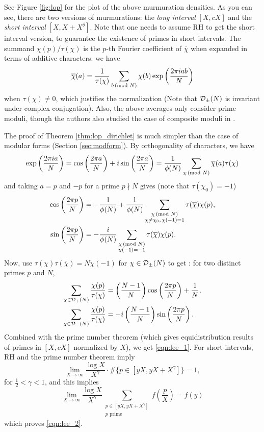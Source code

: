 See Figure \ref{fig:lop} for the plot of the above murmuration densities.
As you can see, there are two versions of murmurations: the \emph{long interval} $[X, cX]$ and the \emph{short interval} $[X, X + X^\delta]$.
Note that one needs to assume RH to get the short interval version, to guarantee the existence of primes in short intervals.
The summand $\chi(p) / \tau(\chi)$ is the $p$-th Fourier coefficient of $\overline{\chi}$ when expanded in terms of additive characters: we have \cite[eq. (3.12)]{iwaniec2021analytic}
\[
\overline{\chi}(a) = \frac{1}{\tau(\chi)} \sum_{b \,(\text{mod }N)} \chi(b) \exp\left(\frac{2 \pi i ab}{N}\right)
\]
when $\tau(\chi) \ne 0$, which justifies the normalization (Note that $\mathcal{D}_\pm(N)$ is invariant under complex conjugation).
Also, the above averages only consider prime moduli, though the authors also studied the case of composite moduli in \cite[Section 6.1]{lee2025murmurations}.

The proof of Theorem \ref{thm:lop_dirichlet} is much simpler than the case of modular forms (Section \ref{sec:modform}).
By orthogonality of characters, we have
\[
\exp\left(\frac{2 \pi i a}{N}\right) = \cos\left(\frac{2 \pi a}{N}\right) + i \sin\left(\frac{2 \pi a}{N}\right) = \frac{1}{\phi(N)} \sum_{\chi \,(\text{mod }N)} \overline{\chi}(a) \tau(\chi)
\]
and taking $a = p$ and $-p$ for a prime $p \nmid N$ gives (note that $\tau(\chi_0) = -1$)
\begin{align*}
    \cos \left(\frac{2\pi p}{N}\right) &= -\frac{1}{\phi(N)} + \frac{1}{\phi(N)} \sum_{\substack{\chi\,(\text{mod }N) \\ \chi \ne \chi_0,\,\chi(-1) = 1}} \tau(\overline{\chi}) \chi(p), \\
    \sin \left(\frac{2 \pi p}{N}\right) &= - \frac{i}{\phi(N)} \sum_{\substack{\chi \,(\text{mod }N) \\ \chi(-1) = -1}} \tau(\overline{\chi}) \chi(p).
\end{align*}
Now, use $\tau(\chi) \tau(\overline{\chi}) = N \chi(-1)$ for $\chi \in \mathcal{D}_{\pm}(N)$ to get \cite[Lemma 2.6]{lee2025murmurations}: for two distinct primes $p$ and $N$,
\begin{align*}
    \sum_{\chi \in \mathcal{D}_{+}(N)} \frac{\chi(p)}{\tau(\chi)} &= \left(\frac{N-1}{N}\right) \cos \left(\frac{2 \pi p}{N}\right) + \frac{1}{N}, \\
    \sum_{\chi \in \mathcal{D}_{-}(N)} \frac{\chi(p)}{\tau(\chi)} &= -i\left(\frac{N-1}{N}\right) \sin \left(\frac{2 \pi p}{N}\right).
\end{align*}
Combined with the prime number theorem (which gives equidistribution results of primes in $[X, cX]$ normalized by $X$), we get \eqref{eqn:lee_1}.
For short intervals, RH and the prime number theorem imply
\[
\lim_{X \to \infty} \frac{\log X}{X^\gamma}\cdot \#\{p \in [yX, yX + X^\gamma]\} = 1,
\]
for $\frac{1}{2} < \gamma < 1$, and this implies \cite[Lemma 2.9]{lee2025murmurations} 
\begin{equation}
\label{eqn:short_avg}
\lim_{X \to \infty} \frac{\log X}{X^\gamma} \sum_{\substack{p \in [yX, yX + X^\gamma] \\ p \text{ prime}}} f\left(\frac{p}{X}\right) = f(y)
\end{equation}
which proves \eqref{eqn:lee_2}.

